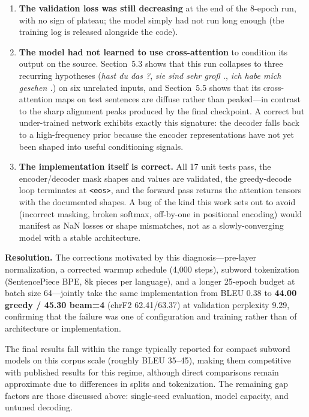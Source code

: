 \begin{enumerate}
\item \textbf{The validation loss was still decreasing} at the end of the 8-epoch run, with no sign of plateau; the model simply had not run long enough (the training log is released alongside the code).
\item \textbf{The model had not learned to use cross-attention} to condition its output on the source. Section~5.3 shows that this run collapses to three recurring hypotheses (\textit{hast du das ?}, \textit{sie sind sehr gro\ss{} .}, \textit{ich habe mich gesehen .}) on six unrelated inputs, and Section~5.5 shows that its cross-attention maps on test sentences are diffuse rather than peaked---in contrast to the sharp alignment peaks produced by the final checkpoint. A correct but under-trained network exhibits exactly this signature: the decoder falls back to a high-frequency prior because the encoder representations have not yet been shaped into useful conditioning signals.
\item \textbf{The implementation itself is correct.} All 17 unit tests pass, the encoder/decoder mask shapes and values are validated, the greedy-decode loop terminates at \texttt{<eos>}, and the forward pass returns the attention tensors with the documented shapes. A bug of the kind this work sets out to avoid (incorrect masking, broken softmax, off-by-one in positional encoding) would manifest as NaN losses or shape mismatches, not as a slowly-converging model with a stable architecture.
\end{enumerate}

\textbf{Resolution.} The corrections motivated by this diagnosis---pre-layer normalization, a corrected warmup schedule (4{,}000 steps), subword tokenization (SentencePiece BPE, 8k pieces per language), and a longer 25-epoch budget at batch size 64---jointly take the same implementation from BLEU 0.38 to \textbf{44.00 greedy / 45.30 beam=4} (chrF2 62.41/63.37) at validation perplexity 9.29, confirming that the failure was one of configuration and training rather than of architecture or implementation.

The final results fall within the range typically reported for compact subword models on this corpus scale (roughly BLEU 35--45), making them competitive with published results for this regime, although direct comparisons remain approximate due to differences in splits and tokenization. The remaining gap factors are those discussed above: single-seed evaluation, model capacity, and untuned decoding.

